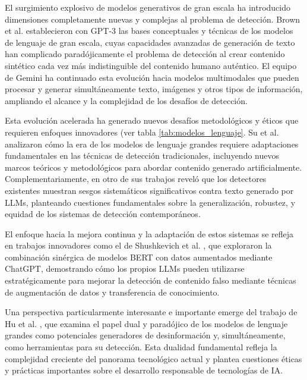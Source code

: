 El surgimiento explosivo de modelos generativos de gran escala ha introducido dimensiones completamente nuevas y complejas al problema de detección. Brown et al. \cite{brown2020language} establecieron con GPT-3 las bases conceptuales y técnicas de los modelos de lenguaje de gran escala, cuyas capacidades avanzadas de generación de texto han complicado paradójicamente el problema de detección al crear contenido sintético cada vez más indistinguible del contenido humano auténtico. El equipo de Gemini \cite{gemini2023family} ha continuado esta evolución hacia modelos multimodales que pueden procesar y generar simultáneamente texto, imágenes y otros tipos de información, ampliando el alcance y la complejidad de los desafíos de detección.

Esta evolución acelerada ha generado nuevos desafíos metodológicos y éticos que requieren enfoques innovadores (ver tabla \ref{tab:modelos_lenguaje}. Su et al. \cite{su2023adapting} analizaron cómo la era de los modelos de lenguaje grandes requiere adaptaciones fundamentales en las técnicas de detección tradicionales, incluyendo nuevos marcos teóricos y metodológicos para abordar contenido generado artificialmente. Complementariamente, en otro de sus trabajos \cite{su2023fake} reveló que los detectores existentes muestran sesgos sistemáticos significativos contra texto generado por LLMs, planteando cuestiones fundamentales sobre la generalización, robustez, y equidad de los sistemas de detección contemporáneos.

El enfoque hacia la mejora continua y la adaptación de estos sistemas se refleja en trabajos innovadores como el de Shushkevich et al. \cite{shushkevich2023improving}, que exploraron la combinación sinérgica de modelos BERT con datos aumentados mediante ChatGPT, demostrando cómo los propios LLMs pueden utilizarse estratégicamente para mejorar la detección de contenido falso mediante técnicas de augmentación de datos y transferencia de conocimiento.

Una perspectiva particularmente interesante e importante emerge del trabajo de Hu et al. \cite{hu2024bad}, que examina el papel dual y paradójico de los modelos de lenguaje grandes como potenciales generadores de desinformación y, simultáneamente, como herramientas para su detección. Esta dualidad fundamental refleja la complejidad creciente del panorama tecnológico actual y plantea cuestiones éticas y prácticas importantes sobre el desarrollo responsable de tecnologías de IA.

